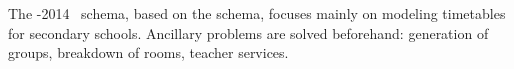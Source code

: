 %
%
%
%
%
The \XHSTT{}-2014~\cite{2014_demirovic_patat, 2017_demirovic_cor,2014_demirovic_lash} schema, based on the \ITC{} schema, focuses mainly on modeling timetables for secondary schools. %
Ancillary problems are solved beforehand: %
generation of groups, breakdown of rooms, teacher services.
